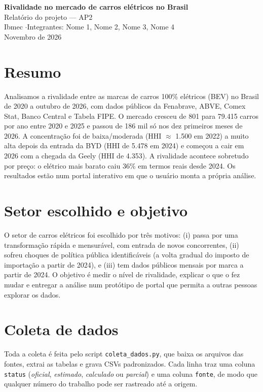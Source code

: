 \documentclass[11pt,a4paper]{article}
\begin{document}
\begin{center}
{\LARGE\bfseries Rivalidade no mercado de carros elétricos no Brasil}\\[4pt]
{\large Relatório do projeto --- AP2}\\[6pt]
Ibmec \quad$\cdot$\quad Integrantes: Nome 1, Nome 2, Nome 3, Nome 4\\[2pt]
\small Novembro de 2026
\end{center}

\section*{Resumo}
Analisamos a rivalidade entre as marcas de carros 100\% elétricos (BEV) no Brasil de 2020 a outubro de 2026, com dados públicos da Fenabrave, ABVE, Comex Stat, Banco Central e Tabela FIPE. O mercado cresceu de 801 para 79.415 carros por ano entre 2020 e 2025 e passou de 186 mil só nos dez primeiros meses de 2026. A concentração foi de baixa/moderada (HHI $\approx$ 1.500 em 2022) a muito alta depois da entrada da BYD (HHI de 5.478 em 2024) e começou a cair em 2026 com a chegada da Geely (HHI de 4.353). A rivalidade acontece sobretudo por preço: o elétrico mais barato caiu 36\% em termos reais desde 2024. Os resultados estão num portal interativo em que o usuário monta a própria análise.

\section{Setor escolhido e objetivo}
O setor de carros elétricos foi escolhido por três motivos: (i) passa por uma transformação rápida e mensurável, com entrada de novos concorrentes, (ii) sofreu choques de política pública identificáveis (a volta gradual do imposto de importação a partir de 2024), e (iii) tem dados públicos mensais por marca a partir de 2024. O objetivo é medir o nível de rivalidade, explicar o que o fez mudar e entregar a análise num protótipo de portal que permita a outras pessoas explorar os dados.

\section{Coleta de dados}
Toda a coleta é feita pelo script \texttt{coleta\_dados.py}, que baixa os arquivos das fontes, extrai as tabelas e grava CSVs padronizados. Cada linha traz uma coluna \texttt{status} (\emph{oficial}, \emph{estimado}, \emph{calculado} ou \emph{parcial}) e uma coluna \texttt{fonte}, de modo que qualquer número do trabalho pode ser rastreado até a origem.
\end{document}
